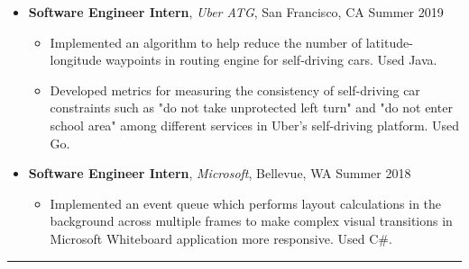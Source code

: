 \documentclass[10pt,letterpaper]{article}
\begin{document}
\begin{itemize}
    \vspace{0.1em}
    \item[]
    {\textbf{Software Engineer Intern}, \textit{Uber ATG}, San Francisco, CA \hfill {Summer 2019}}
    \begin{itemize}[label=\textbullet]
      \itemsep0.1em
      \item Implemented an algorithm to help reduce the number of
      latitude-longitude waypoints in routing engine for self-driving cars. Used Java.
      \item Developed metrics for measuring the consistency of self-driving car constraints such as "do not take unprotected left turn" and "do not enter school area" among different services in Uber's self-driving platform. Used Go.
    \end{itemize}
    \vspace{0.1em}
    \item[]
    {\textbf{Software Engineer Intern}, \textit{Microsoft}, Bellevue, WA \hfill {Summer 2018}}
    \begin{itemize}[label=\textbullet]
      \itemsep0.1em
      \item Implemented an event queue which performs layout calculations in the background 
      across multiple frames to make complex visual transitions in Microsoft Whiteboard application
      more responsive. Used C\#.
    \end{itemize}


  \end{itemize}

\hrule
\vspace{-0.95em}
\end{document}
